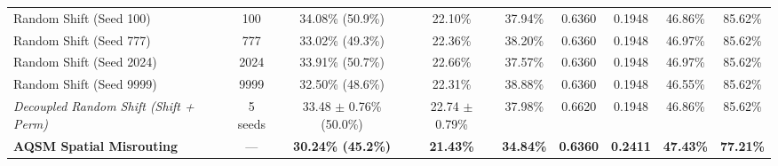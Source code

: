 \begin{table}[!htbp]
{\begin{tabular}{lcccccccc}
Random Shift (Seed 100) & 100 & 34.08\% (50.9\%) & 22.10\% & 37.94\% & 0.6360 & 0.1948 & 46.86\% & 85.62\% \\
Random Shift (Seed 777) & 777 & 33.02\% (49.3\%) & 22.36\% & 38.20\% & 0.6360 & 0.1948 & 46.97\% & 85.62\% \\
Random Shift (Seed 2024) & 2024 & 33.91\% (50.7\%) & 22.66\% & 37.57\% & 0.6360 & 0.1948 & 46.97\% & 85.62\% \\
Random Shift (Seed 9999) & 9999 & 32.50\% (48.6\%) & 22.31\% & 38.88\% & 0.6360 & 0.1948 & 46.55\% & 85.62\% \\
\midrule
\textit{Decoupled Random Shift (Shift + Perm)} & 5 seeds & 33.48 $\pm$ 0.76\% (50.0\%) & 22.74 $\pm$ 0.79\% & 37.98\% & 0.6620 & 0.1948 & 46.86\% & 85.62\% \\
\midrule
\textbf{AQSM Spatial Misrouting} & --- & \textbf{30.24\% (45.2\%)} & \textbf{21.43\%} & \textbf{34.84\%} & \textbf{0.6360} & \textbf{0.2411} & \textbf{47.43\%} & \textbf{77.21\%} \\
\bottomrule
\end{tabular}%
}
\end{table}